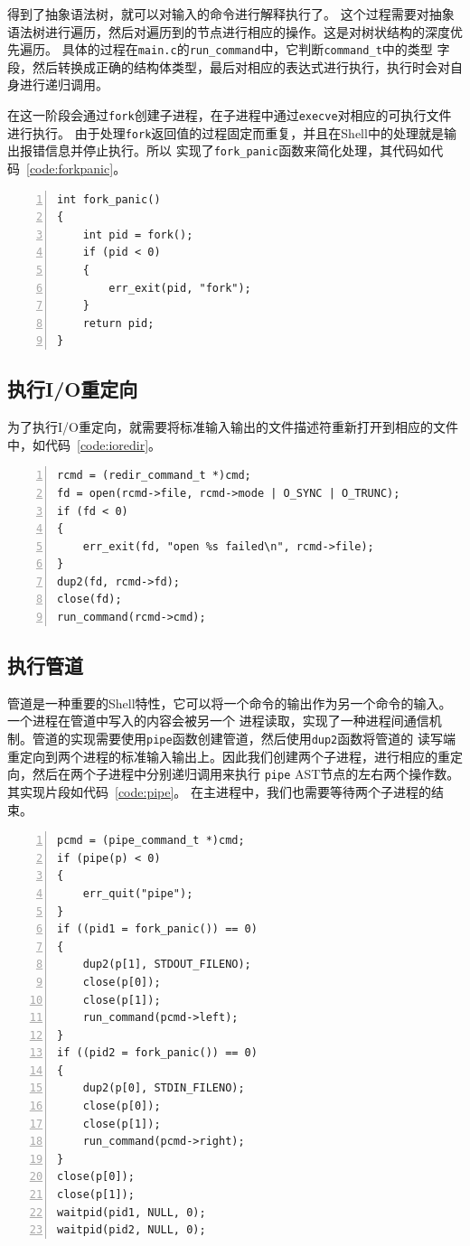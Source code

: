 \documentclass[a4paper,twoside]{article}
\begin{document}
\begin{spacing}{1.2}
得到了抽象语法树，就可以对输入的命令进行解释执行了。
这个过程需要对抽象语法树进行遍历，然后对遍历到的节点进行相应的操作。这是对树状结构的深度优先遍历。
具体的过程在\texttt{main.c}的\texttt{run\_command}中，它判断\texttt{command\_t}中的类型
字段，然后转换成正确的结构体类型，最后对相应的表达式进行执行，执行时会对自身进行递归调用。

在这一阶段会通过\texttt{fork}创建子进程，在子进程中通过\texttt{execve}对相应的可执行文件进行执行。
由于处理\texttt{fork}返回值的过程固定而重复，并且在Shell中的处理就是输出报错信息并停止执行。所以
实现了\texttt{fork\_panic}函数来简化处理，其代码如代码~\ref*{code:forkpanic}。

\begin{lstlisting}[numbers=left,style=CppStyle,caption=解释执行,label={code:forkpanic}]
int fork_panic()
{
	int pid = fork();
	if (pid < 0)
	{
		err_exit(pid, "fork");
	}
	return pid;
}
\end{lstlisting}

\subsection{执行I/O重定向}

为了执行I/O重定向，就需要将标准输入输出的文件描述符重新打开到相应的文件中，如代码~\ref{code:ioredir}。

\begin{lstlisting}[numbers=left,style=CppStyle,caption=I/O重定向,label={code:ioredir}]
rcmd = (redir_command_t *)cmd;
fd = open(rcmd->file, rcmd->mode | O_SYNC | O_TRUNC);
if (fd < 0)
{
	err_exit(fd, "open %s failed\n", rcmd->file);
}
dup2(fd, rcmd->fd);
close(fd);
run_command(rcmd->cmd);
\end{lstlisting}


\subsection{执行管道}

管道是一种重要的Shell特性，它可以将一个命令的输出作为另一个命令的输入。一个进程在管道中写入的内容会被另一个
进程读取，实现了一种进程间通信机制。管道的实现需要使用\texttt{pipe}函数创建管道，然后使用\texttt{dup2}函数将管道的
读写端重定向到两个进程的标准输入输出上。因此我们创建两个子进程，进行相应的重定向，然后在两个子进程中分别递归调用来执行
\texttt{pipe} AST节点的左右两个操作数。
其实现片段如代码~\ref{code:pipe}。
在主进程中，我们也需要等待两个子进程的结束。

\begin{lstlisting}[numbers=left,style=CppStyle,caption=处理管道的执行,label={code:pipe}]
pcmd = (pipe_command_t *)cmd;
if (pipe(p) < 0)
{
	err_quit("pipe");
}
if ((pid1 = fork_panic()) == 0)
{
	dup2(p[1], STDOUT_FILENO);
	close(p[0]);
	close(p[1]);
	run_command(pcmd->left);
}
if ((pid2 = fork_panic()) == 0)
{
	dup2(p[0], STDIN_FILENO);
	close(p[0]);
	close(p[1]);
	run_command(pcmd->right);
}
close(p[0]);
close(p[1]);
waitpid(pid1, NULL, 0);
waitpid(pid2, NULL, 0);
\end{lstlisting}


\end{spacing}
\end{document}
